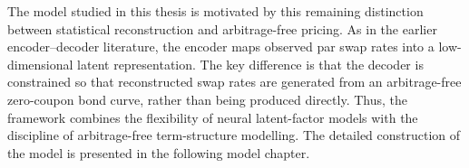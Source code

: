 The model studied in this thesis is motivated by this remaining distinction between statistical reconstruction and arbitrage-free pricing. As in the earlier encoder--decoder literature, the encoder maps observed par swap rates into a low-dimensional latent representation. The key difference is that the decoder is constrained so that reconstructed swap rates are generated from an arbitrage-free zero-coupon bond curve, rather than being produced directly. Thus, the framework combines the flexibility of neural latent-factor models with the discipline of arbitrage-free term-structure modelling. The detailed construction of the model is presented in the following model chapter.